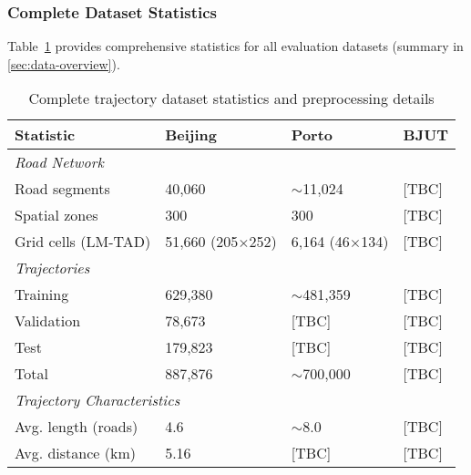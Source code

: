 \subsubsection{Complete Dataset Statistics}
\label{app:dataset-stats}

Table~\ref{tab:dataset-stats-appendix} provides comprehensive statistics for all evaluation datasets (summary in \autoref{sec:data-overview}).

\begin{table}[H]
    \centering
    \caption{Complete trajectory dataset statistics and preprocessing details}
    \label{tab:dataset-stats-appendix}
    \small
    \begin{tabular}{llll}
        \toprule
        \textbf{Statistic}              & \textbf{Beijing}        & \textbf{Porto}        & \textbf{BJUT} \\
        \midrule
        \multicolumn{4}{l}{\textit{Road Network}}                                                         \\
        \quad Road segments             & 40,060                  & $\sim$11,024          & [TBC]         \\
        \quad Spatial zones             & 300                     & 300                   & [TBC]         \\
        \quad Grid cells (LM-TAD)       & 51,660 (205$\times$252) & 6,164 (46$\times$134) & [TBC]         \\
        \midrule
        \multicolumn{4}{l}{\textit{Trajectories}}                                                         \\
        \quad Training                  & 629,380                 & $\sim$481,359         & [TBC]         \\
        \quad Validation                & 78,673                  & [TBC]                 & [TBC]         \\
        \quad Test                      & 179,823                 & [TBC]                 & [TBC]         \\
        \quad Total                     & 887,876                 & $\sim$700,000         & [TBC]         \\
        \midrule
        \multicolumn{4}{l}{\textit{Trajectory Characteristics}}                                           \\
        \quad Avg. length (roads)       & 4.6                     & $\sim$8.0             & [TBC]         \\
        \quad Avg. distance (km)        & 5.16                    & [TBC]                 & [TBC]         \\

\end{tabular}
\end{table}
